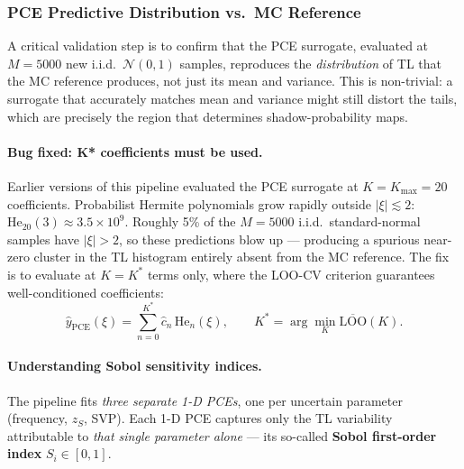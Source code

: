 \documentclass[11pt,a4paper]{article}
\begin{document}
\subsubsection{PCE Predictive Distribution vs.\ MC Reference}
\label{sec:pce_dist}

A critical validation step is to confirm that the PCE surrogate, evaluated at $M=5000$
new i.i.d.\ $\mathcal{N}(0,1)$ samples, reproduces the \emph{distribution} of TL
that the MC reference produces, not just its mean and variance.
This is non-trivial: a surrogate that accurately matches mean and variance might still
distort the tails, which are precisely the region that determines shadow-probability maps.

\paragraph{Bug fixed: K* coefficients must be used.}
Earlier versions of this pipeline evaluated the PCE surrogate at $K=K_{\max}=20$
coefficients.  Probabilist Hermite polynomials grow rapidly outside $|\xi| \lesssim 2$:
$\mathrm{He}_{20}(3) \approx 3.5\times10^9$.
Roughly 5\% of the $M=5000$ i.i.d.\ standard-normal samples have $|\xi|>2$, so these
predictions blow up --- producing a spurious near-zero cluster in the TL histogram
entirely absent from the MC reference.
The fix is to evaluate at $K=K^*$ terms only, where the LOO-CV criterion guarantees
well-conditioned coefficients:
\begin{equation}
  \hat{y}_{\mathrm{PCE}}(\xi) = \sum_{n=0}^{K^*} \hat{c}_n \,\mathrm{He}_n(\xi),
  \qquad K^* = \arg\min_K \overline{\mathrm{LOO}}(K).
  \label{eq:pce_eval_kstar}
\end{equation}

\paragraph{Understanding Sobol sensitivity indices.}
The pipeline fits \emph{three separate 1-D PCEs}, one per uncertain parameter (frequency,
$z_S$, SVP).  Each 1-D PCE captures only the TL variability attributable to \emph{that
single parameter alone} --- its so-called \textbf{Sobol first-order index}
$S_i \in [0,1]$.
\end{document}
